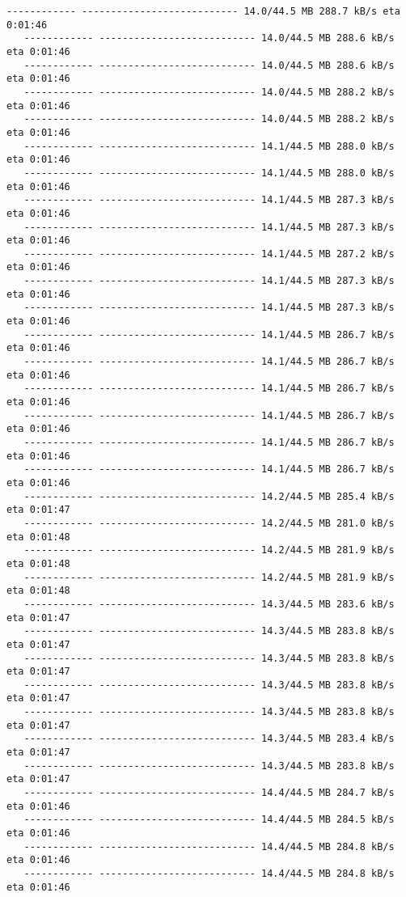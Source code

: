 \documentclass[11pt]{article}
\begin{document}
\begin{Verbatim}[commandchars=\\\{\}]
   ------------ --------------------------- 14.0/44.5 MB 288.7 kB/s eta 0:01:46
   ------------ --------------------------- 14.0/44.5 MB 288.6 kB/s eta 0:01:46
   ------------ --------------------------- 14.0/44.5 MB 288.6 kB/s eta 0:01:46
   ------------ --------------------------- 14.0/44.5 MB 288.2 kB/s eta 0:01:46
   ------------ --------------------------- 14.0/44.5 MB 288.2 kB/s eta 0:01:46
   ------------ --------------------------- 14.1/44.5 MB 288.0 kB/s eta 0:01:46
   ------------ --------------------------- 14.1/44.5 MB 288.0 kB/s eta 0:01:46
   ------------ --------------------------- 14.1/44.5 MB 287.3 kB/s eta 0:01:46
   ------------ --------------------------- 14.1/44.5 MB 287.3 kB/s eta 0:01:46
   ------------ --------------------------- 14.1/44.5 MB 287.2 kB/s eta 0:01:46
   ------------ --------------------------- 14.1/44.5 MB 287.3 kB/s eta 0:01:46
   ------------ --------------------------- 14.1/44.5 MB 287.3 kB/s eta 0:01:46
   ------------ --------------------------- 14.1/44.5 MB 286.7 kB/s eta 0:01:46
   ------------ --------------------------- 14.1/44.5 MB 286.7 kB/s eta 0:01:46
   ------------ --------------------------- 14.1/44.5 MB 286.7 kB/s eta 0:01:46
   ------------ --------------------------- 14.1/44.5 MB 286.7 kB/s eta 0:01:46
   ------------ --------------------------- 14.1/44.5 MB 286.7 kB/s eta 0:01:46
   ------------ --------------------------- 14.1/44.5 MB 286.7 kB/s eta 0:01:46
   ------------ --------------------------- 14.2/44.5 MB 285.4 kB/s eta 0:01:47
   ------------ --------------------------- 14.2/44.5 MB 281.0 kB/s eta 0:01:48
   ------------ --------------------------- 14.2/44.5 MB 281.9 kB/s eta 0:01:48
   ------------ --------------------------- 14.2/44.5 MB 281.9 kB/s eta 0:01:48
   ------------ --------------------------- 14.3/44.5 MB 283.6 kB/s eta 0:01:47
   ------------ --------------------------- 14.3/44.5 MB 283.8 kB/s eta 0:01:47
   ------------ --------------------------- 14.3/44.5 MB 283.8 kB/s eta 0:01:47
   ------------ --------------------------- 14.3/44.5 MB 283.8 kB/s eta 0:01:47
   ------------ --------------------------- 14.3/44.5 MB 283.8 kB/s eta 0:01:47
   ------------ --------------------------- 14.3/44.5 MB 283.4 kB/s eta 0:01:47
   ------------ --------------------------- 14.3/44.5 MB 283.8 kB/s eta 0:01:47
   ------------ --------------------------- 14.4/44.5 MB 284.7 kB/s eta 0:01:46
   ------------ --------------------------- 14.4/44.5 MB 284.5 kB/s eta 0:01:46
   ------------ --------------------------- 14.4/44.5 MB 284.8 kB/s eta 0:01:46
   ------------ --------------------------- 14.4/44.5 MB 284.8 kB/s eta 0:01:46

\end{Verbatim}
\end{document}
